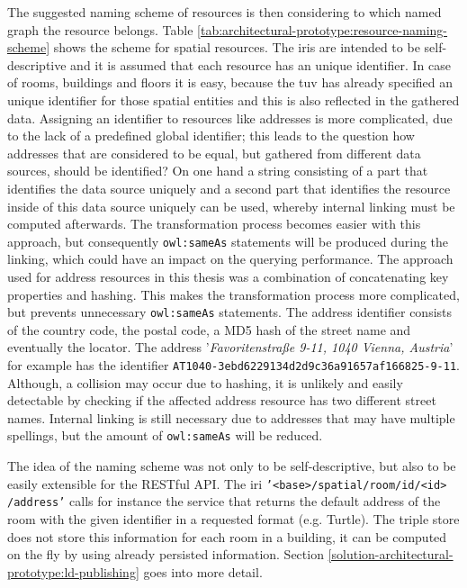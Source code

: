 \documentclass[draft,final]{vutinfth} %
\begin{document}
The suggested naming scheme of resources is then considering to which named graph the resource belongs. Table \ref{tab:architectural-prototype:resource-naming-scheme} shows the scheme for spatial resources. The \gls{iri}s are intended to be self-descriptive and it is assumed that each resource has an unique identifier. In case of rooms, buildings and floors it is easy, because the \gls{tuv} has already  specified an unique identifier for those spatial entities and this is also reflected in the gathered data. Assigning an identifier to resources like addresses is more complicated, due to the lack of a predefined global identifier; this leads to the question how addresses that are considered to be equal, but gathered from different data sources, should be identified? On one hand a string consisting of a part that identifies the data source uniquely and a second part that identifies the resource inside of this data source uniquely can be used, whereby internal linking must be computed afterwards. The transformation process becomes easier with this approach, but consequently \texttt{owl:sameAs} statements will be produced during the linking, which could have an impact on the querying performance. The approach used for address resources in this thesis was a combination of concatenating key properties and hashing. This makes the transformation process more complicated, but prevents unnecessary \texttt{owl:sameAs} statements. The address identifier consists of the country code, the postal code, a MD5 hash of the street name and eventually the locator. The address  '\textit{Favoritenstraße 9-11, 1040 Vienna, Austria}' for example has the identifier \texttt{AT1040-3ebd6229134d2d9c36a91657af166825-9-11}. Although, a collision may occur due to hashing, it is unlikely and easily detectable by checking if the affected address resource has two different street names. Internal linking is still necessary due to addresses that may have multiple spellings, but the amount of \texttt{owl:sameAs} will be reduced.

The idea of the naming scheme was not only to be self-descriptive, but also to be easily extensible for the RESTful API. The \gls{iri} \texttt{'<base>/spatial/room/id/<id>\\/address'} calls for instance the service that returns the default address of the room with the given identifier in a requested format (e.g. Turtle). The triple store does not store this information for each room in a building, it can be computed on the fly by using already persisted information. Section \ref{solution-architectural-prototype:ld-publishing} goes into more detail.
\end{document}
